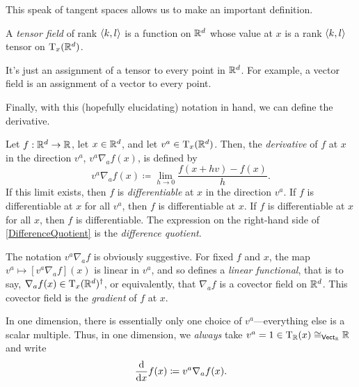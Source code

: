This speak of tangent spaces allows us to make an important definition.
\begin{dfn}\label{TensorField}
A \emph{tensor field} of rank $\langle k,l\rangle$ is a function on $\mathbb{R} ^d$ whose value at $x$ is a rank $\langle k,l\rangle$ tensor on $\tangent[\R ^d][x]$.
\begin{rmk}
It's just an assignment of a tensor to every point in $\mathbb{R} ^d$.  For example, a vector field is an assignment of a vector to every point.
\end{rmk}
\end{dfn}

Finally, with this (hopefully elucidating) notation in hand, we can define the derivative.
\begin{dfn}
\begin{savenotes}
Let $f:\mathbb{R} ^d\rightarrow \mathbb{R}$, let $x\in \mathbb{R} ^d$, and let $v^a\in \tangent[\R ^d][x]$.  Then, the \emph{derivative} of $f$ at $x$ in the direction $v^a$, $v^a\nabla _af(x)$, is defined by
\begin{equation}\label{DifferenceQuotient}
v^a\nabla _af(x)\coloneqq \lim _{h\to 0}\frac{f(x+hv)-f(x)}{h}.
\end{equation}
If this limit exists, then $f$ is \emph{differentiable} at $x$ in the direction $v^a$.  If $f$ is differentiable at $x$ for all $v^a$, then $f$ is differentiable at $x$.  If $f$ is differentiable at $x$ for all $x$, then $f$ is differentiable.  The expression on the right-hand side of \eqref{DifferenceQuotient} is the \emph{difference quotient}.
\begin{rmk}
The notation $v^a\nabla _af$ is obviously suggestive.  For fixed $f$ and $x$, the map $v^a\mapsto [v^a\nabla _af](x)$ is linear in $v^a$, and so defines a \emph{linear functional}, that is to say, $\nabla _af(x)\in \tangent[\R ^d][x]^{\dagger}$, or equivalently, that $\nabla _af$ is a covector field on $\mathbb{R} ^d$.  This covector field is the \emph{gradient} of $f$ at $x$.
\end{rmk}
\begin{rmk}
In one dimension, there is essentially only one choice of $v^a$---everything else is a scalar multiple.  Thus, in one dimension, we \emph{always} take $v^a=1\in \tangent[x][\R ]\cong _{\Vect _\R}\R$ and write
\begin{equation}
\frac{\mathop{}\!\mathrm{d}}{\mathop{}\!\mathrm{d} x}f(x)\coloneqq v^a\nabla _af(x).
\end{equation}

\end{rmk}
\end{savenotes}
\end{dfn}
